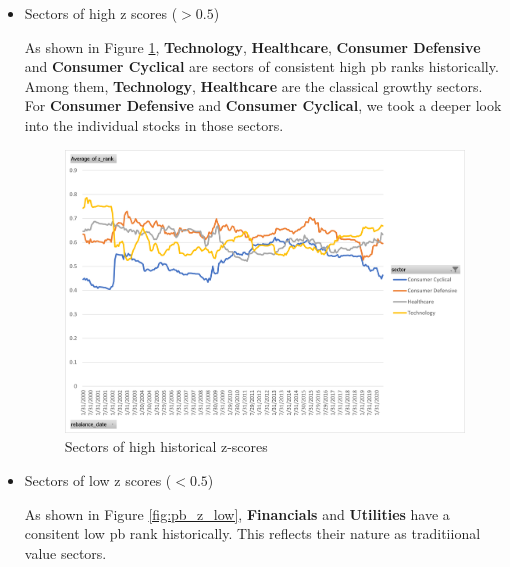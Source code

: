 \documentclass[11pt]{article} %
\begin{document}
\begin{itemize}

\item Sectors of high z scores ($>0.5$)

As shown in Figure \ref{fig:pb_z_high}, \textbf{Technology}, \textbf{Healthcare}, \textbf{Consumer Defensive} and \textbf{Consumer Cyclical} are sectors of consistent high pb ranks historically. Among them,  \textbf{Technology}, \textbf{Healthcare} are the classical growthy sectors. For \textbf{Consumer Defensive} and \textbf{Consumer Cyclical}, we took a deeper look into the individual stocks in those sectors.

\begin{figure}[H]
\centering
\includegraphics[scale=0.7]{pb_z_score_sector_high.png}
\caption{Sectors of high historical z-scores}
\label{fig:pb_z_high}
\end{figure}


\item Sectors of low z scores ($<0.5$)

As shown in Figure \ref{fig:pb_z_low}, \textbf{Financials } and \textbf{Utilities} have a consitent low pb rank historically. This reflects their nature as traditiional value sectors.


\end{itemize}
\end{document}
